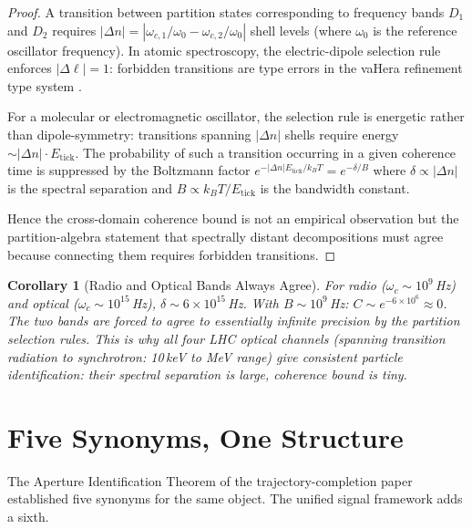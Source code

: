 \documentclass[twocolumn,10pt,a4paper]{article}
\theoremstyle{thmstyle}
\newtheorem{corollary}[theorem]{Corollary}
\theoremstyle{definition}
\theoremstyle{remark}
\begin{document}
\begin{proof}
A transition between partition states corresponding to frequency bands $D_1$
and $D_2$ requires $|\Delta n| = |\omega_{c,1}/\omega_0 - \omega_{c,2}/\omega_0|$
shell levels (where $\omega_0$ is the reference oscillator frequency).
In atomic spectroscopy, the electric-dipole selection rule enforces
$|\Delta\ell| = 1$: forbidden transitions are type errors in the vaHera
refinement type system \citep{companion:types}.

For a molecular or electromagnetic oscillator, the selection rule is
energetic rather than dipole-symmetry: transitions spanning $|\Delta n|$
shells require energy $\sim |\Delta n| \cdot E_\text{tick}$.
The probability of such a transition occurring in a given coherence time
is suppressed by the Boltzmann factor $e^{-|\Delta n| E_\text{tick}/k_B T}
= e^{-\delta/B}$ where $\delta \propto |\Delta n|$ is the spectral
separation and $B \propto k_B T / E_\text{tick}$ is the bandwidth constant.

Hence the cross-domain coherence bound is not an empirical observation
but the partition-algebra statement that spectrally distant decompositions
must agree because connecting them requires forbidden transitions.
\end{proof}

\begin{corollary}[Radio and Optical Bands Always Agree]
For radio ($\omega_c \sim 10^9$\,Hz) and optical ($\omega_c \sim 10^{15}$\,Hz),
$\delta \sim 6 \times 10^{15}$\,Hz.  With $B \sim 10^9$\,Hz:
$C \sim e^{-6\times 10^6} \approx 0$.  The two bands are forced to agree
to essentially infinite precision by the partition selection rules.
This is why all four LHC optical channels (spanning transition radiation
to synchrotron: 10\,keV to MeV range) give consistent particle identification:
their spectral separation is large, coherence bound is tiny.
\end{corollary}

\section{Five Synonyms, One Structure}
\label{sec:synonyms}

The Aperture Identification Theorem of the trajectory-completion paper
\citep{companion:trajectory} established five synonyms for the same object.
The unified signal framework adds a sixth.
\end{document}

